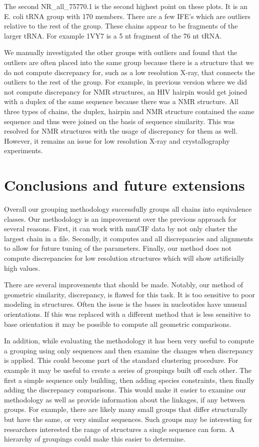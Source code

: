 The second NR\_all\_75770.1 is the second highest point on these plots. It is an
E. coli tRNA group with 170 members. There are a few IFE’s which are outliers
relative to the rest of the group. These chains appear to be fragments of the
larger tRNA. For example 1VY7 is a 5 nt fragment of the 76 nt tRNA.

We manually investigated the other groups with outliers and found that the
outliers are often placed into the same group because there is a structure that
we do not compute discrepancy for, such as a low resolution X-ray, that connects
the outliers to the rest of the group. For example, in previous version where we
did not compute discrepancy for NMR structures, an HIV hairpin would get joined
with a duplex of the same sequence because there was a NMR structure. All three
types of chains, the duplex, hairpin and NMR structure contained the same
sequence and thus were joined on the basis of sequence similarity. This was
resolved for NMR structures with the usage of discrepancy for them as well.
However, it remains an issue for low resolution X-ray and crystallography
experiments.

\section{Conclusions and future extensions}

Overall our grouping methodology successfully groups all chains into equivalence
classes. Our methodology is an improvement over the previous approach for
several reasons. First, it can work with mmCIF data by not only cluster the
largest chain in a file. Secondly, it computes and all discrepancies and
alignments to allow for future tuning of the parameters. Finally, our method
does not compute discrepancies for low resolution structures which will show
artificially high values.

There are several improvements that should be made. Notably, our method of
geometric similarity, discrepancy, is flawed for this task. It is too sensitive
to poor modeling in structures. Often the issue is the bases in nucleotides have
unusual orientations. If this was replaced with a different method that is less
sensitive to base orientation it may be possible  to compute all geometric
comparisons.

In addition, while evaluating the methodology it has been very useful to compute
a grouping using only sequences and then examine the changes when discrepancy is
applied. This could become part of the standard clustering procedure. For
example it may be useful to create a series of groupings built off each other.
The first a simple sequence only building, then adding species constraints, then
finally adding the discrepancy comparisons. This would make it easier to examine
our methodology as well as provide information about the linkages, if any
between groups. For example, there are likely many small groups that differ
structurally but have the same, or very similar sequences. Such groups may be
interesting for researchers interested the range of structures a single sequence
can form. A hierarchy of groupings could make this easier to determine.

